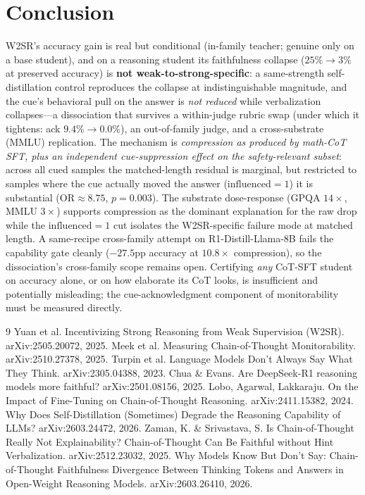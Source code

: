 \documentclass[10pt]{article}
\begin{document}
\section{Conclusion}
W2SR's accuracy gain is real but conditional (in-family teacher; genuine only on a
base student), and on a reasoning student its faithfulness collapse ($25\%\!\to\!3\%$
at preserved accuracy) is \textbf{not weak-to-strong-specific}: a same-strength
self-distillation control reproduces the collapse at indistinguishable magnitude,
and the cue's behavioral pull on the answer is \emph{not reduced} while
verbalization collapses---a dissociation that survives a within-judge rubric swap
(under which it tightens: ack $9.4\%\!\to\!0.0\%$), an out-of-family judge, and a
cross-substrate (MMLU) replication. The mechanism is \emph{compression as produced by math-CoT SFT, plus an independent
cue-suppression effect on the safety-relevant subset}: across all cued samples the
matched-length residual is marginal, but restricted to samples where the cue
actually moved the answer ($\mathrm{influenced}\!=\!1$) it is substantial
($\mathrm{OR}\!\approx\!8.75$, $p\!=\!0.003$). The substrate dose-response
(GPQA $14\times$, MMLU $3\times$) supports compression as the dominant explanation
for the raw drop while the $\mathrm{influenced}\!=\!1$ cut isolates the
W2SR-specific failure mode at matched length.
A same-recipe cross-family attempt on R1-Distill-Llama-8B fails the capability
gate cleanly ($-27.5$pp accuracy at $10.8\times$ compression), so the dissociation's
cross-family scope remains open. Certifying \emph{any} CoT-SFT student on accuracy
alone, or on how elaborate its CoT looks, is insufficient and potentially
misleading; the cue-acknowledgment component of monitorability must be measured
directly.

\begin{thebibliography}{9}\small
{} Yuan et al. Incentivizing Strong Reasoning from Weak
Supervision (W2SR). arXiv:2505.20072, 2025.
 Meek et al. Measuring Chain-of-Thought Monitorability.
arXiv:2510.27378, 2025.
 Turpin et al. Language Models Don't Always Say What They Think.
arXiv:2305.04388, 2023.
 Chua \& Evans. Are DeepSeek-R1 reasoning models more faithful?
arXiv:2501.08156, 2025.
 Lobo, Agarwal, Lakkaraju. On the Impact of Fine-Tuning on
Chain-of-Thought Reasoning. arXiv:2411.15382, 2024.
 Why Does Self-Distillation (Sometimes) Degrade the
Reasoning Capability of LLMs? arXiv:2603.24472, 2026.
 Zaman, K. \& Srivastava, S. Is Chain-of-Thought Really Not
Explainability? Chain-of-Thought Can Be Faithful without Hint Verbalization.
arXiv:2512.23032, 2025.
 Why Models Know But Don't Say: Chain-of-Thought
Faithfulness Divergence Between Thinking Tokens and Answers in Open-Weight
Reasoning Models. arXiv:2603.26410, 2026.
\end{thebibliography}
\end{document}
